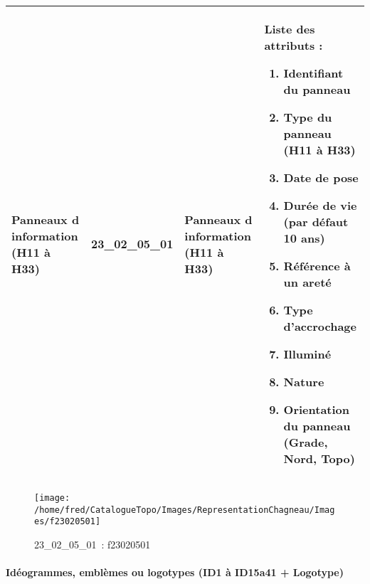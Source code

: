 \documentclass[12pt,titlepage]{book}
\begin{document}
\renewcommand{\arraystretch}{1.2}
\begin{supertabular}{|p{10cm}|c|p{13cm}|p{12cm}|}
 Panneaux d information (H11 à H33) & 23\_02\_05\_01 & Panneaux d information (H11 à H33) & Liste des attributs :
\begin{enumerate}
  \item Identifiant du panneau  \item Type du panneau (H11 à H33)  \item Date de pose  \item Durée de vie (par défaut 10 ans)  \item Référence à un areté  \item Type d'accrochage  \item Illuminé  \item Nature  \item Orientation du panneau (Grade, Nord, Topo)\end{enumerate}
\\
\hline
\end{supertabular}
\begin{figure}[h!]
  \hfill         %
  \begin{minipage}[t]{3cm}
    \begin{center}
      \texttt{[image: /home/fred/CatalogueTopo/Images/RepresentationChagneau/Images/f23020501]}
      \caption[~23\_02\_05\_01]{\small{23\_02\_05\_01~:} \tiny{f23020501}}\label{f23020501}
    \end{center}
  \end{minipage}
\end{figure}


\paragraph{Idéogrammes, emblèmes ou logotypes (ID1 à ID15a41 + Logotype)}
\noindent
\vspace{\baselineskip}
\end{document}
